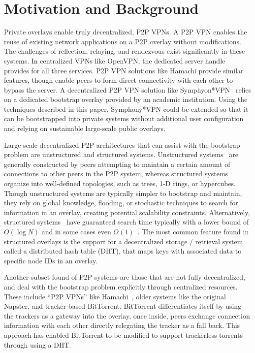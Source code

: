 \documentclass[conference]{IEEEtran}
\begin{document}
\section{Motivation and Background}
\label{background}

Private overlays enable truly decentralized, P2P VPNs.  A P2P VPN enables the
reuse of existing network applications on a P2P overlay without modifications.
The challenges of reflection, relaying, and rendezvous exist significantly in
these systems.  In centralized VPNs like OpenVPN, the dedicated server handle
provides for all three services.  P2P VPN solutions like Hamachi provide
similar features, though enable peers to form direct connectivity with each
other to bypass the server.  A decentralized P2P VPN solution like
Symphyon*VPN~\cite{socialvpn} relies on a dedicated bootstrap overlay provided by
an academic institution.  Using the techniques described in this paper,
Symphony*VPN could be extended so that it can be bootstrapped into private systems
without additional user configuration and relying on sustainable large-scale
public overlays.

Large-scale decentralized P2P architectures that can assist with the bootstrap
problem are unstructured and structured systems.  Unstructured
systems~\cite{gnutella, fasttrack} are generally constructed by peers
attempting to maintain a certain amount of connections to other peers in the
P2P system, whereas structured systems organize into well-defined topologies,
such as trees, 1-D rings, or hypercubes.  Though unstructured systems are
typically simpler to bootstrap and maintain, they rely on global knowledge,
flooding, or stochastic techniques to search for information in an overlay,
creating potential scalability constraints.  Alternatively, structured
systems~\cite{pastry, chord, symphony, kademlia, can} have guaranteed search
time typically with a lower bound of $O(\log N)$ and in some cases even
$O(1)$~\cite{beehive}.  The most common feature found in structured overlays is
the support for a decentralized storage / retrieval system called a distributed
hash table (DHT), that maps keys with associated data to specific node IDs in
an overlay.  

Another subset found of P2P systems are those that are not fully decentralized,
and deal with the bootstrap problem explicitly through centralized resources.
These include ``P2P VPNs'' like Hamachi~\cite{hamachi}, older systems like the
original Napster, and tracker-based BitTorrent.  BitTorrent differentiates
itself by using the trackers as a gateway into the overlay, once inside, peers
exchange connection information with each other directly relegating the tracker
as a fall back.  This approach has enabled BitTorrent to be modified to support
trackerless torrents through using a DHT.
\end{document}
